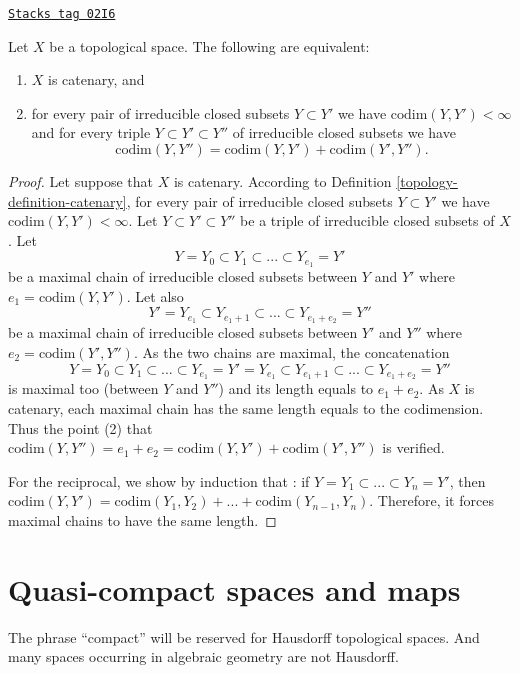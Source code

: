 \begin{lemma}
\label{topology-lemma-catenary-in-codimension}
\href{https://stacks.math.columbia.edu/tag/02I6}{\texttt{Stacks tag 02I6}}

Let $X$ be a topological space. The following are equivalent:
\begin{enumerate}
\item $X$ is catenary, and
\item for every pair of irreducible closed subsets $Y \subset Y'$ we have
$\text{codim}(Y, Y') < \infty$ and for every triple
$Y \subset Y' \subset Y''$ of irreducible closed subsets we have
$$
\text{codim}(Y, Y'') = \text{codim}(Y, Y') + \text{codim}(Y', Y'').
$$
\end{enumerate}
\end{lemma}

\begin{proof}

Let suppose that $X$ is catenary. According to
Definition \ref{topology-definition-catenary}, for every pair of
irreducible closed subsets $Y \subset Y'$ we have
$\text{codim}(Y,Y') < \infty$. Let $Y \subset Y' \subset Y''$
be a triple of irreducible closed subsets of $X$. Let
$$
Y = Y_0 \subset Y_1 \subset ... \subset Y_{e_1} = Y'
$$
be a maximal chain of irreducible closed subsets between $Y$ and $Y'$
where $e_1 = \text{codim}(Y,Y')$. Let also
$$
Y' = Y_{e_1} \subset Y_{e_1 + 1}\subset ... \subset Y_{e_1 + e_2} = Y''
$$
be a maximal chain of irreducible closed subsets between $Y'$
and $Y''$ where $e_2 = \text{codim}(Y',Y'')$.
As the two chains are maximal, the concatenation
$$
Y = Y_0\subset Y_1 \subset ... \subset Y_{e_1} = Y' =
Y_{e_1} \subset Y_{e_1+1}\subset ... \subset Y_{e_1+e_2}=Y''
$$
is maximal too (between $Y$ and $Y''$) and its length equals to $e_1 + e_2$.
As $X$ is catenary, each maximal chain has the same length equals to the
codimension. Thus the point (2) that
$\text{codim}(Y,Y'') = e_1 + e_2 = \text{codim}(Y,Y') + \text{codim}(Y',Y'')$
is verified.

\medskip\noindent
For the reciprocal, we show by induction that : if $Y = Y_1 \subset ... \subset
Y_n = Y'$, then $ \text{codim}(Y,Y') = \text{codim}(Y_1,Y_2) + ... +
\text{codim}(Y_{n-1},Y_n)$. Therefore, it forces maximal chains to have the
same length.
\end{proof}

\section{Quasi-compact spaces and maps}
\label{topology-section-quasi-compact}
The phrase ``compact'' will be reserved
for Hausdorff topological spaces. And many spaces occurring
in algebraic geometry are not Hausdorff.

